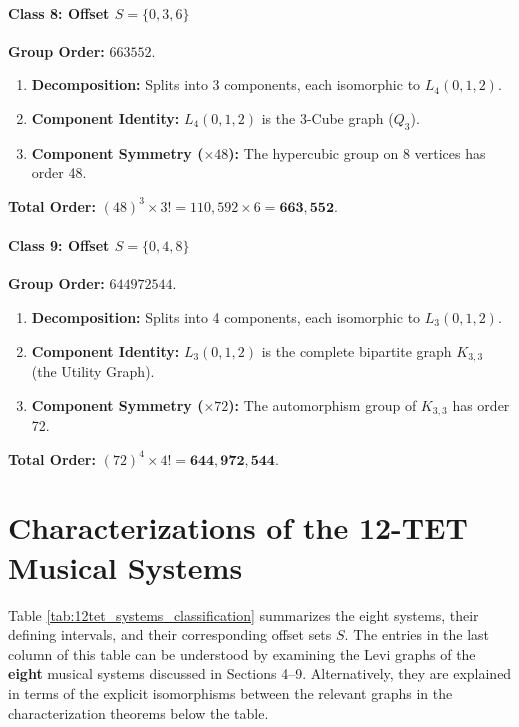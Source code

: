 \documentclass[12pt,letterpaper]{amsart}
\begin{document}
\paragraph{\bf Class 8: Offset $S = \{0, 3, 6\}$}


\textbf{Group Order:} $663552$.

\begin{enumerate}
    \item \textbf{Decomposition:} Splits into 3 components, each isomorphic to $L_4(0, 1, 2)$.
    \item \textbf{Component Identity:} $L_4(0, 1, 2)$ is the 3-Cube graph ($Q_3$).
    \item \textbf{Component Symmetry ($\times 48$):} The hypercubic group on 8 vertices has order 48.
\end{enumerate}

\textbf{Total Order:} $(48)^3 \times 3! = 110,592 \times 6 = \mathbf{663,552}$.

\paragraph{\bf Class 9: Offset $S = \{0, 4, 8\}$}


\textbf{Group Order:} $644972544$.
\begin{enumerate}
    \item \textbf{Decomposition:} Splits into 4 components, each isomorphic to $L_3(0, 1, 2)$.
    \item \textbf{Component Identity:} $L_3(0, 1, 2)$ is the complete bipartite graph $K_{3,3}$ (the Utility Graph).
    \item \textbf{Component Symmetry ($\times 72$):} The automorphism group of $K_{3,3}$ has order 72.
\end{enumerate}

\textbf{Total Order:} $(72)^4 \times 4! = \mathbf{644,972,544}$.

\section{Characterizations of the 12-TET Musical Systems}\label{sec9}
Table \ref{tab:12tet_systems_classification} summarizes the eight systems, their defining intervals, and their corresponding offset sets $S$. The entries in the last column of this table can be understood by examining the Levi graphs of the \textbf{eight} musical systems discussed in Sections 4--9. Alternatively, they are explained in terms of the explicit isomorphisms between the relevant graphs in the characterization theorems below the table.
\end{document}
